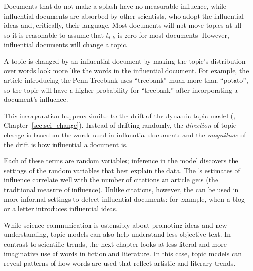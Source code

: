 Documents that do not make a splash have no measurable influence, while influential
documents are absorbed by other scientists, who adopt the influential ideas and, critically, their language.  Most documents will not move topics
at all so it is reasonable to assume that $l_{d,k}$ is zero for most
documents.  However, influential documents will change a topic.

A topic is changed by an influential document by making the topic's
distribution over words look more like the words in the influential document.  For example, the article
introducing the Penn Treebank uses ``treebank'' much more than
``potato'', so the topic will have a higher probability for
``treebank'' after incorporating a document's influence.

This incorporation happens similar to the drift of the dynamic topic
model (, Chapter~\ref{sec:sci_change}).  Instead of drifting
randomly, the \emph{direction} of topic change is based on the words
used in influential documents and the \emph{magnitude} of the drift is
how influential a document is.

Each of these terms are random variables; inference in the model discovers the
settings of the random variables that best explain the data.  The 's
estimates of influence correlate well with the number of citations an article
gets (the traditional measure of influence).  Unlike citations, however, the
 can be used in more informal settings to detect influential
documents: for example, when a blog or a letter introduces influential
ideas.

While science communication is ostensibly about promoting ideas and new
understanding, topic models can also help understand less objective
text.
In contrast to scientific trends, the next chapter looks at less literal and more imaginative use of words in fiction and literature.
In this case, topic models can reveal patterns of how words are used
that reflect artistic and literary trends.

